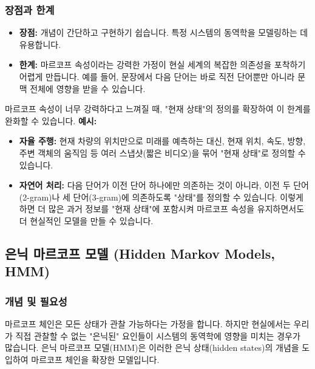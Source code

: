 \documentclass[11pt,a4paper]{article}
\theoremstyle{definition}
\begin{document}
\subsubsection{장점과 한계}
\begin{itemize}
    \item \textbf{장점:} 개념이 간단하고 구현하기 쉽습니다. 특정 시스템의 동역학을 모델링하는 데 유용합니다.
    \item \textbf{한계:} 마르코프 속성이라는 강력한 가정이 현실 세계의 복잡한 의존성을 포착하기 어렵게 만듭니다. 예를 들어, 문장에서 다음 단어는 바로 직전 단어뿐만 아니라 문맥 전체에 영향을 받을 수 있습니다.
\end{itemize}

\begin{tcolorbox}[warningbox, title=마르코프 속성의 한계 극복]
마르코프 속성이 너무 강력하다고 느껴질 때, "현재 상태"의 정의를 확장하여 이 한계를 완화할 수 있습니다.
\textbf{예시:}
\begin{itemize}
    \item \textbf{자율 주행:} 현재 차량의 위치만으로 미래를 예측하는 대신, 현재 위치, 속도, 방향, 주변 객체의 움직임 등 여러 스냅샷(짧은 비디오)을 묶어 "현재 상태"로 정의할 수 있습니다.
    \item \textbf{자연어 처리:} 다음 단어가 이전 단어 하나에만 의존하는 것이 아니라, 이전 두 단어(2-gram)나 세 단어(3-gram)에 의존하도록 "상태"를 정의할 수 있습니다. 이렇게 하면 더 많은 과거 정보를 "현재 상태"에 포함시켜 마르코프 속성을 유지하면서도 더 현실적인 모델을 만들 수 있습니다.
\end{itemize}
\end{tcolorbox}

\subsection{은닉 마르코프 모델 (Hidden Markov Models, HMM)}

\subsubsection{개념 및 필요성}
마르코프 체인은 모든 상태가 관찰 가능하다는 가정을 합니다. 하지만 현실에서는 우리가 직접 관찰할 수 없는 "은닉된" 요인들이 시스템의 동역학에 영향을 미치는 경우가 많습니다. 은닉 마르코프 모델(HMM)은 이러한 은닉 상태(hidden states)의 개념을 도입하여 마르코프 체인을 확장한 모델입니다.
\end{document}
